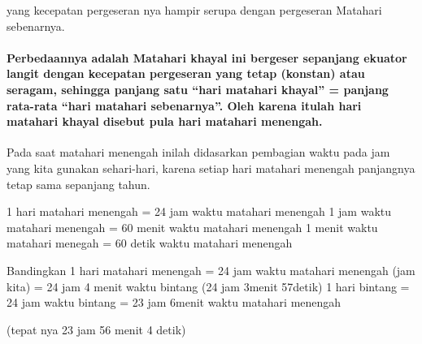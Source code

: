 {{ yang kecepatan pergeseran nya hampir serupa dengan pergeseran Matahari sebenarnya.}
 
 \paragraph{Perbedaannya adalah Matahari khayal ini bergeser sepanjang ekuator langit 
 dengan kecepatan pergeseran yang tetap (konstan) atau seragam, sehingga panjang satu
 “hari matahari khayal” = panjang rata-rata “hari matahari sebenarnya”. 
 Oleh karena itulah hari matahari khayal disebut pula hari matahari menengah.}

 
  Pada saat matahari menengah inilah didasarkan pembagian waktu pada jam yang kita gunakan sehari-hari, karena setiap hari matahari menengah panjangnya tetap sama sepanjang tahun.

	1 hari matahari menengah = 24 jam waktu matahari menengah 
	1 jam waktu matahari menengah = 60 menit waktu matahari menengah
	1 menit waktu matahari menegah = 60 detik waktu matahari menengah
	
	Bandingkan
	1 hari matahari menengah = 24 jam waktu matahari menengah (jam kita)
							 = 24 jam 4 menit waktu bintang (24 jam 3menit 57detik)
	1 hari bintang		     = 24 jam waktu bintang
							 = 23 jam 6menit waktu matahari menengah 

							  (tepat nya 23 jam 56 menit 4 detik)}
								  
